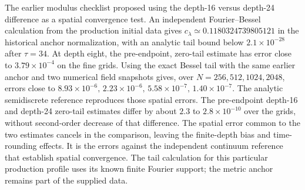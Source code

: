 The earlier modulus checklist proposed using the
depth-16 versus depth-24 difference as a spatial
convergence test. An independent Fourier--Bessel
calculation from the production initial data gives
$c_\lambda\simeq0.1180324739805121$ in the historical
anchor normalization, with an analytic tail bound
below $2.1\times10^{-28}$ after $\tau=34$.
At depth eight, the pre-endpoint, zero-tail estimate
has error close to $3.79\times10^{-4}$ on the fine grids.
Using the exact Bessel tail with the same earlier
anchor and two numerical field snapshots gives,
over $N=256,512,1024,2048$, errors close to
$8.93\times10^{-6},\,2.23\times10^{-6},\,
5.58\times10^{-7},\,1.40\times10^{-7}$.
The analytic semidiscrete reference reproduces those
spatial errors. The pre-endpoint depth-16 and
depth-24 zero-tail estimates differ by about
$2.3$ to $2.8\times10^{-10}$ over the grids,
without second-order decrease of that difference.
The spatial error common to the two estimates
cancels in the comparison, leaving the finite-depth
bias and time-rounding effects.
It is the errors against the independent continuum
reference that establish spatial convergence.
The tail calculation for this particular production
profile uses its known finite Fourier support;
the metric anchor remains part of the supplied data.
